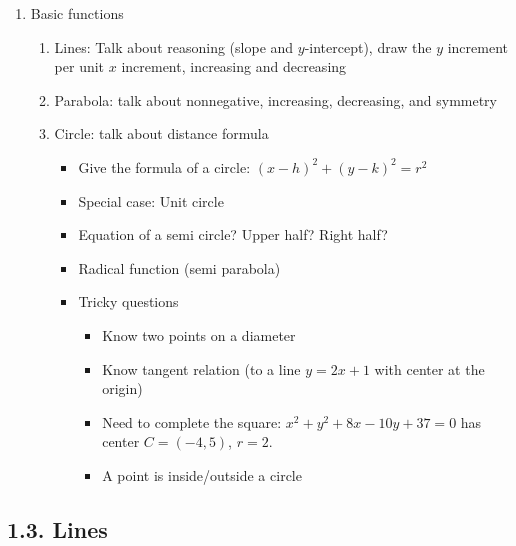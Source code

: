 \documentclass{article}
\begin{document}
\begin{enumerate}
\item Basic functions
\begin{enumerate}
\item Lines: Talk about reasoning (slope and $y$-intercept), draw the $y$ increment per unit $x$ increment, increasing and decreasing
\item Parabola: talk about nonnegative, increasing, decreasing, and symmetry
\item Circle: talk about distance formula
\begin{itemize}
\item Give the formula of a circle: $(x-h)^2+(y-k)^2=r^2$
\item Special case: Unit circle
\item Equation of a semi circle? Upper half? Right half?
\item Radical function (semi parabola)
\item Tricky questions
\begin{itemize}
\item Know two points on a diameter
\item Know tangent relation (to a line $y=2x+1$ with center at the origin)
\item Need to complete the square: $x^2+y^2+8x-10y+37=0$ has center $C=(-4,5)$, $r=2$.
\item A point is inside/outside a circle
\end{itemize}
\end{itemize}
\end{enumerate}
\end{enumerate}


\subsection{1.3. Lines}
\end{document}
